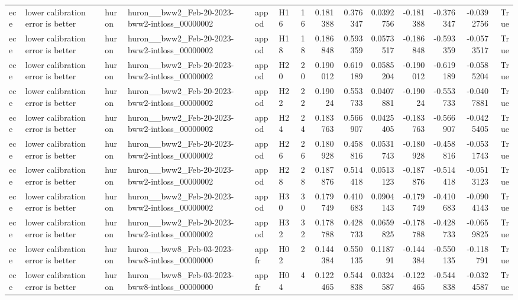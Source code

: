 \begin{longtable}{llllllrrrrrrrr}
ece & lower calibration error is better & huron & huron\_\_bww2\_Feb-20-2023-bww2-intloss\_00000002 & appod & H16 & 16 & 0.181388 & 0.376347 & 0.0392756 & -0.181388 & -0.376347 & -0.0392756 & True \\
ece & lower calibration error is better & huron & huron\_\_bww2\_Feb-20-2023-bww2-intloss\_00000002 & appod & H18 & 18 & 0.186848 & 0.593359 & 0.0573517 & -0.186848 & -0.593359 & -0.0573517 & True \\
ece & lower calibration error is better & huron & huron\_\_bww2\_Feb-20-2023-bww2-intloss\_00000002 & appod & H20 & 20 & 0.190012 & 0.619189 & 0.0585204 & -0.190012 & -0.619189 & -0.0585204 & True \\
ece & lower calibration error is better & huron & huron\_\_bww2\_Feb-20-2023-bww2-intloss\_00000002 & appod & H22 & 22 & 0.19024 & 0.553733 & 0.0407881 & -0.19024 & -0.553733 & -0.0407881 & True \\
ece & lower calibration error is better & huron & huron\_\_bww2\_Feb-20-2023-bww2-intloss\_00000002 & appod & H24 & 24 & 0.183763 & 0.566907 & 0.0425405 & -0.183763 & -0.566907 & -0.0425405 & True \\
ece & lower calibration error is better & huron & huron\_\_bww2\_Feb-20-2023-bww2-intloss\_00000002 & appod & H26 & 26 & 0.180928 & 0.458816 & 0.0531743 & -0.180928 & -0.458816 & -0.0531743 & True \\
ece & lower calibration error is better & huron & huron\_\_bww2\_Feb-20-2023-bww2-intloss\_00000002 & appod & H28 & 28 & 0.187876 & 0.514418 & 0.0513123 & -0.187876 & -0.514418 & -0.0513123 & True \\
ece & lower calibration error is better & huron & huron\_\_bww2\_Feb-20-2023-bww2-intloss\_00000002 & appod & H30 & 30 & 0.179749 & 0.410683 & 0.0904143 & -0.179749 & -0.410683 & -0.0904143 & True \\
ece & lower calibration error is better & huron & huron\_\_bww2\_Feb-20-2023-bww2-intloss\_00000002 & appod & H32 & 32 & 0.178788 & 0.428733 & 0.0659825 & -0.178788 & -0.428733 & -0.0659825 & True \\
ece & lower calibration error is better & huron & huron\_\_bww8\_Feb-03-2023-bww8-intloss\_00000000 & appfr & H02 & 2 & 0.144384 & 0.550135 & 0.118791 & -0.144384 & -0.550135 & -0.118791 & True \\
ece & lower calibration error is better & huron & huron\_\_bww8\_Feb-03-2023-bww8-intloss\_00000000 & appfr & H04 & 4 & 0.122465 & 0.544838 & 0.0324587 & -0.122465 & -0.544838 & -0.0324587 & True \\

\end{longtable}
